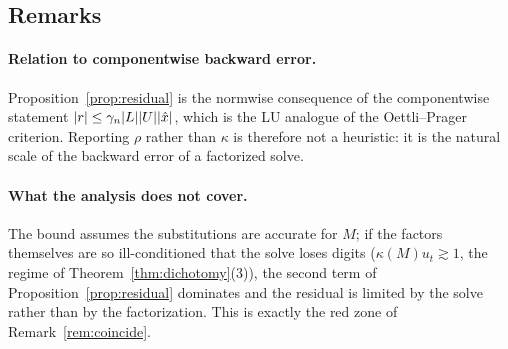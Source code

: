 \subsection{Remarks}

\paragraph{Relation to componentwise backward error.}
Proposition~\ref{prop:residual} is the normwise consequence of the componentwise
statement $\lvert r \rvert\le\gamma_n\lvert L \rvert\lvert U \rvert\lvert \hat x \rvert$, which is the LU
analogue of the Oettli--Prager criterion. Reporting $\rho$ rather than
$\kappa$ is therefore not a heuristic: it is the natural scale of the backward
error of a factorized solve.

\paragraph{What the analysis does not cover.}
The bound assumes the substitutions are accurate for $M$; if the factors
themselves are so ill-conditioned that the solve loses digits ($\kappa(M)u_t\gtrsim1$,
the regime of Theorem~\ref{thm:dichotomy}(3)), the second term of
Proposition~\ref{prop:residual} dominates and the residual is limited by the
solve rather than by the factorization. This is exactly the red zone of
Remark~\ref{rem:coincide}.
